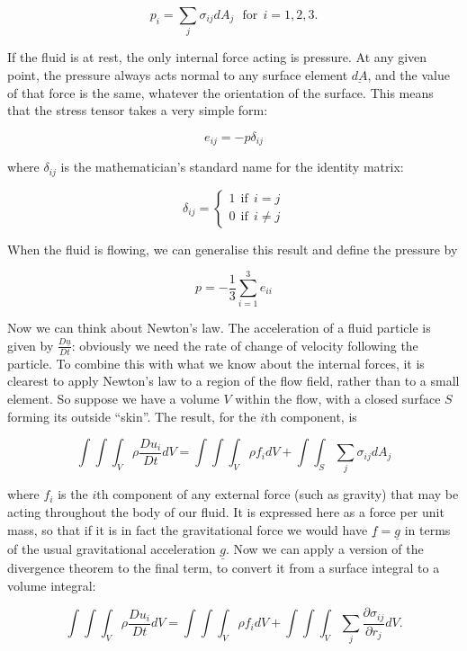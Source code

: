   $$p_i=\sum_j{\sigma_{ij} dA_j}\mathrm{~~~for~~}i=1,2,3 . \tag{14}$$ 

  If the fluid is at rest, the only internal force acting is pressure. At any 
  given point, the pressure always acts normal to any surface element 
  $\underline{dA}$, and the value of that force is the same, whatever the 
  orientation of the surface. This means that the stress tensor takes a very 
  simple form: 

  $$e_{ij}=-p \delta_{ij} \tag{15}$$ 

  where $\delta_{ij}$ is the mathematician's standard name for the identity 
  matrix: 

  $$\delta_{ij} = \left\lbrace \begin{matrix} {1 \mathrm{~~if~~} i=j}\\{0 
  \mathrm{~~if~~} i\ne j}\end{matrix} \right. \tag{16}$$ 

  When the fluid is flowing, we can generalise this result and define the 
  pressure by 

  $$p=-\dfrac{1}{3} \sum_{i=1}^3{e_{ii}} \tag{17}$$ 

  Now we can think about Newton's law. The acceleration of a fluid particle is 
  given by $\frac{D\underline{u}}{Dt}$: obviously we need the rate of change of 
  velocity following the particle. To combine this with what we know about the 
  internal forces, it is clearest to apply Newton's law to a region of the flow 
  field, rather than to a small element. So suppose we have a volume $V$ within 
  the flow, with a closed surface $S$ forming its outside ``skin''. The result, 
  for the $i\mathrm{th}$ component, is 

  $$\int{\int{\int_V{\rho \dfrac{Du_i}{Dt} dV}}}=\int{\int{\int_V{\rho f_i 
  dV}}}+\int{\int_S{\sum_j{\sigma_{ij} dA_j }}} \tag{18}$$ 

  where $f_i$ is the $i\mathrm{th}$ component of any external force (such as 
  gravity) that may be acting throughout the body of our fluid. It is expressed 
  here as a force per unit mass, so that if it is in fact the gravitational 
  force we would have $\underline{f}=\underline{g}$ in terms of the usual 
  gravitational acceleration $\underline{g}$. Now we can apply a version of the 
  divergence theorem to the final term, to convert it from a surface integral 
  to a volume integral: 

  $$\int{\int{\int_V{\rho \dfrac{Du_i}{Dt} dV}}}=\int{\int{\int_V{\rho f_i 
  dV}}}+\int{\int{\int_V{\sum_j{\dfrac{\partial \sigma_{ij}}{\partial r_j} dV 
  }}}} . \tag{19}$$ 

